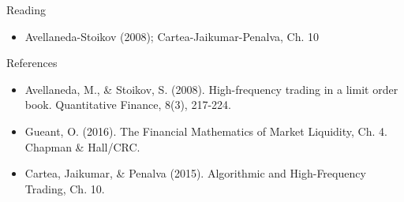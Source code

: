 \documentclass[aspectratio=169,10pt]{beamer}
\begin{document}
\begin{frame}{Reading}
\begin{itemize}
  \item Avellaneda-Stoikov (2008); Cartea-Jaikumar-Penalva, Ch. 10
\end{itemize}
\end{frame}

\begin{frame}{References}
\scriptsize\begin{itemize}\setlength{\itemsep}{3pt}
  \item Avellaneda, M., \& Stoikov, S. (2008). High-frequency trading in a limit order book. Quantitative Finance, 8(3), 217-224.
  \item Gueant, O. (2016). The Financial Mathematics of Market Liquidity, Ch. 4. Chapman \& Hall/CRC.
  \item Cartea, Jaikumar, \& Penalva (2015). Algorithmic and High-Frequency Trading, Ch. 10.
\end{itemize}
\end{frame}
\end{document}
